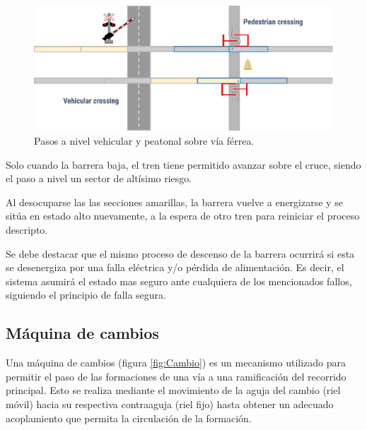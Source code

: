 			\begin{figure}[h!]
				\centering
				\includegraphics[scale=0.4]{./Figures/Paso a nivel}
				\caption{Pasos a nivel vehicular y peatonal sobre vía férrea.}
				\label{fig:Paso_a_nivel}
			\end{figure}
			
			Solo cuando la barrera baja, el tren tiene permitido avanzar sobre el cruce, siendo el paso a nivel un sector de altísimo riesgo.
			
			Al desocuparse las las secciones amarillas, la barrera vuelve a energizarse y se sitúa en estado alto nuevamente, a la espera de otro tren para reiniciar el proceso descripto.
						
			Se debe destacar que el mismo proceso de descenso de la barrera ocurrirá si esta se desenergiza por una falla eléctrica y/o pérdida de alimentación. Es decir, el sistema asumirá el estado mas seguro ante cualquiera de los mencionados fallos, siguiendo el principio de falla segura.
		
		\subsection{Máquina de cambios}
			
			Una máquina de cambios (figura \ref{fig:Cambio}) es un mecanismo utilizado para permitir el paso de las formaciones de una vía a una ramificación del recorrido principal. Esto se realiza mediante el movimiento de la aguja del cambio (riel móvil) hacia su respectiva contraaguja (riel fijo) hasta obtener un adecuado acoplamiento que permita la circulación de la formación.
			
